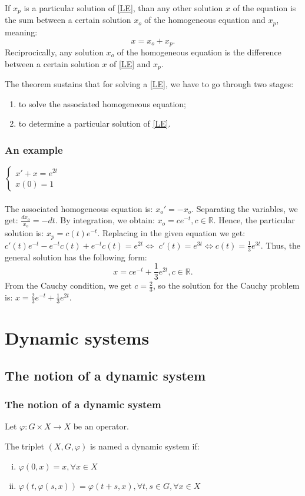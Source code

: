 \documentclass[11]{beamer}
\newcommand{\R}{\mathbb{R}}
\begin{document}
\begin{frame}
\begin{theorem}
 If $x_{p}$ is a particular solution of \eqref{LE}, than any other solution $x$ of the equation is the sum between a certain solution $x_{o}$ of the homogeneous equation and $x_{p}$, meaning: $$x=x_{o}+x_{p}.$$ Reciprocically, any solution $x_{o}$ of the homogeneous equation is the difference between a certain solution $x$ of \eqref{LE} and $x_{p}$.
\end{theorem}
The theorem sustains that for solving a \eqref{LE}, we have to go through two stages:
\begin{enumerate}
 \item to solve the associated homogeneous equation;
 \item to determine a particular solution of \eqref{LE}.
\end{enumerate}
\end{frame}
\begin{frame}
 \frametitle{An example}
  $\begin{cases}
       x'+x=e^{2t}\\
       x(0)=1
      \end{cases}$\\\\
      The associated homogeneous equation is: $x_{o}'=-x_{o}.$ Separating the variables, we get: $\frac{dx_{o}}{x_{o}}=-dt.$ By integration, we obtain: $x_{o}=ce^{-t},c\in\R.$
      Hence, the particular solution is: $x_{p}=c(t)e^{-t}.$ Replacing in the given equation we get: $c'(t)e^{-t}-e^{-t}c(t)+e^{-t}c(t)=e^{2t}\Leftrightarrow$
      $c'(t)=e^{3t}\Leftrightarrow c(t)=\frac{1}{3}e^{3t}.$
      Thus, the general solution has the following form:
      $$x=ce^{-t}+\frac{1}{3}e^{2t}, c\in \R.$$
      From the Cauchy condition, we get $c=\frac{2}{3}$, so the solution for the Cauchy problem is: $x=\frac{2}{3}e^{-t}+\frac{1}{3}e^{2t}.$
\end{frame}
\section{Dynamic systems}
\subsection{The notion of a dynamic system}
\begin{frame}
 \frametitle{The notion of a dynamic system}
 Let $\varphi:G\times X\rightarrow X$ be an operator.
\begin{definition}
 The triplet $(X,G,\varphi)$ is named a dynamic system if:
 \begin{enumerate}[i)]
  \item $\varphi(0,x)=x,\forall x\in X$
  \item $\varphi(t,\varphi(s,x))=\varphi(t+s,x),\forall t,s \in G, \forall x\in X$
 \end{enumerate}
\end{definition}
 
 
\end{frame}
\end{document}
